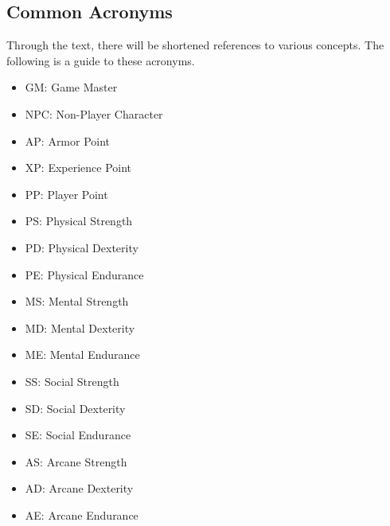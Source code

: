 \begin{multicols}{2}
\section{Common Acronyms}

Through the text, there will be shortened references to various concepts.
The following is a guide to these acronyms.

\begin{itemize}
  \item GM: Game Master
  \item NPC: Non-Player Character
  \item AP: Armor Point
  \item XP: Experience Point
  \item PP: Player Point
  \item PS: Physical Strength
  \item PD: Physical Dexterity
  \item PE: Physical Endurance
  \item MS: Mental Strength
  \item MD: Mental Dexterity
  \item ME: Mental Endurance
  \item SS: Social Strength
  \item SD: Social Dexterity
  \item SE: Social Endurance
  \item AS: Arcane Strength
  \item AD: Arcane Dexterity
  \item AE: Arcane Endurance
\end{itemize}

\end{multicols}
